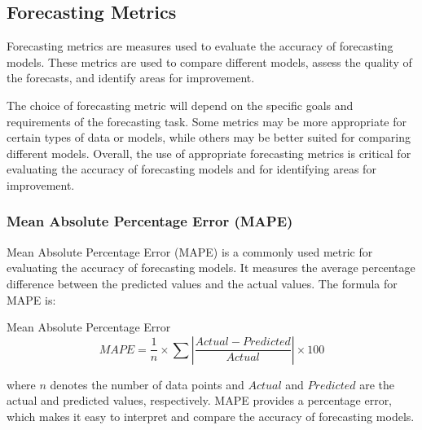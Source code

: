   
  \subsection{Forecasting Metrics}
  \label{sec:forecasting-metrics-evaluation-setup}

    Forecasting metrics \cite{botchkarevPerformanceMetricsError2018} are measures used to evaluate the accuracy of forecasting models. These metrics are used to compare different models, assess the quality of the forecasts, and identify areas for improvement.





    The choice of forecasting metric will depend on the specific goals and requirements of the forecasting task. Some metrics may be more appropriate for certain types of data or models, while others may be better suited for comparing different models.
    Overall, the use of appropriate forecasting metrics is critical for evaluating the accuracy of forecasting models and for identifying areas for improvement.

    \subsubsection{Mean Absolute Percentage Error (MAPE)}
    \label{sec:mape-metrics-evaluation}
      Mean Absolute Percentage Error (MAPE) \cite{demyttenaereMeanAbsolutePercentage2016} is a commonly used metric for evaluating the accuracy of forecasting models. It measures the average percentage difference between the predicted values and the actual values.
      The formula for MAPE is:

      \begin{pabox}{Mean Absolute Percentage Error}
        $$MAPE = \frac{1}{n} \times \sum \left|\frac{Actual - Predicted}{Actual}\right| \times 100$$
      \end{pabox}
      where $n$ denotes the number of data points and $Actual$ and $Predicted$ are the actual and predicted values, respectively.
      MAPE provides a percentage error, which makes it easy to interpret and compare the accuracy of forecasting models. 
      
